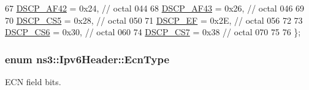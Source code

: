 \begin{DoxyCode}
67       \hyperlink{classns3_1_1Ipv6Header_afdc89ed9acd990a7613782323e4c95eeab6fa7d5d863f57165e0015c63cfc0e6e}{DSCP\_AF42} = 0x24, \textcolor{comment}{// octal 044}
68       \hyperlink{classns3_1_1Ipv6Header_afdc89ed9acd990a7613782323e4c95eea17f9516e4d622d1d897d6403c9dfab80}{DSCP\_AF43} = 0x26, \textcolor{comment}{// octal 046}
69 
70       \hyperlink{classns3_1_1Ipv6Header_afdc89ed9acd990a7613782323e4c95eead364f05de5efaa46b961255865a8bf94}{DSCP\_CS5}  = 0x28, \textcolor{comment}{// octal 050}
71       \hyperlink{classns3_1_1Ipv6Header_afdc89ed9acd990a7613782323e4c95eeac251fb08fc5b74f674c749280643ace1}{DSCP\_EF}   = 0x2E, \textcolor{comment}{// octal 056}
72 
73       \hyperlink{classns3_1_1Ipv6Header_afdc89ed9acd990a7613782323e4c95eeaa929dcffd5ea53ee827428a5040042bd}{DSCP\_CS6}  = 0x30, \textcolor{comment}{// octal 060}
74       \hyperlink{classns3_1_1Ipv6Header_afdc89ed9acd990a7613782323e4c95eea9c9fce68ef927ccff61117b22d711fc5}{DSCP\_CS7}  = 0x38  \textcolor{comment}{// octal 070}
75 
76     \};
\end{DoxyCode}
\subsubsection[{\texorpdfstring{Ecn\+Type}{EcnType}}]{\setlength{\rightskip}{0pt plus 5cm}enum {\bf ns3\+::\+Ipv6\+Header\+::\+Ecn\+Type}}\hypertarget{classns3_1_1Ipv6Header_a8d6d294ba3232974841ebd721de29ace}{}\label{classns3_1_1Ipv6Header_a8d6d294ba3232974841ebd721de29ace}


E\+CN field bits. 

